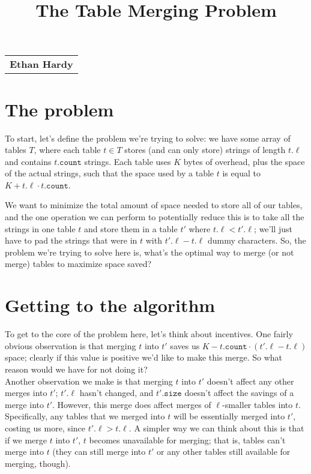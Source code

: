 \documentclass{article}[12]
\title{\textbf{The Table Merging Problem}\vspace{-5ex}}
\date{}
\begin{document}
\maketitle

\null\hfill\begin{tabular}[t]{l@{}}
  \textbf{Ethan Hardy} \\
\end{tabular}

\section{The problem}

To start, let's define the problem we're trying to solve: we have some array of tables $T$, where each table $t \in T$ stores (and can only store) strings of length $t.\ell$ and contains $t.\texttt{count}$ strings. Each table uses $K$ bytes of overhead, plus the space of the actual strings, such that the space used by a table $t$ is equal to $K + t.\ell \cdot t.\texttt{count}$.


We want to minimize the total amount of space needed to store all of our tables, and the one operation we can perform to potentially reduce this is to take all the strings in one table $t$ and store them in a table $t'$ where $t.\ell < t'.\ell$; we'll just have to pad the strings that were in $t$ with $t'.\ell - t.\ell$ dummy characters. So, the problem we're trying to solve here is, what's the optimal way to merge (or not merge) tables to maximize space saved?

\section{Getting to the algorithm}
To get to the core of the problem here, let's think about incentives. One fairly obvious observation is that merging $t$ into $t'$ saves us $K - t.\texttt{count} \cdot (t'.\ell - t.\ell)$ space; clearly if this value is positive we'd like to make this merge. So what reason would we have for not doing it?\\

Another observation we make is that merging $t$ into $t'$ doesn't affect any other merges into $t'$; $t'.\ell$ hasn't changed, and $t'.\texttt{size}$ doesn't affect the savings of a merge into $t'$. However, this merge does affect merges of $\ell$-smaller tables into $t$. Specifically, any tables that we merged into $t$ will be essentially merged into $t'$, costing us more, since $t'.\ell > t.\ell$. A simpler way we can think about this is that if we merge $t$ into $t'$, $t$ becomes unavailable for merging; that is, tables can't merge into $t$ (they can still merge into $t'$ or any other tables still available for merging, though).\\
\end{document}
